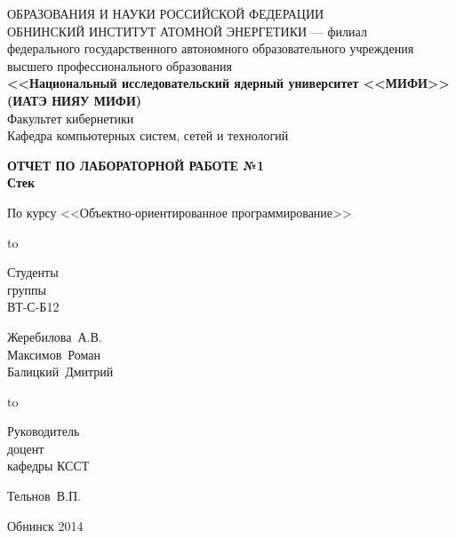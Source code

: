 
\begin{titlepage}
\newpage

\begin{center}
{\small{} ОБРАЗОВАНИЯ И НАУКИ РОССИЙСКОЙ ФЕДЕРАЦИИ\\
ОБНИНСКИЙ ИНСТИТУТ АТОМНОЙ ЭНЕРГЕТИКИ --- филиал}\\
федерального государственного автономного образовательного учреждения\\
высшего профессионального образования\\
{\bf<<Национальный исследовательский ядерный университет <<МИФИ>>\\
(ИАТЭ НИЯУ МИФИ)}\\
\vspace{2em}
Факультет кибернетики\\
Кафедра компьютерных систем, сетей и технологий
\end{center}
\vspace{2em}


\vspace{5em}
\begin{center}
\textbf{ОТЧЕТ ПО ЛАБОРАТОРНОЙ РАБОТЕ №1\\ Стек}
\end{center}


\begin{center}
По курсу <<Объектно-ориентированное программирование>>
\end{center}

\vspace{6em}

\hbox to \textwidth
{\parbox{6 cm}{Студенты\\ группы\\ ВТ-С-Б12}\dotfill \parbox{4 cm}{
\begin{flushright}Жеребилова~А.В.\\ Максимов~Роман\\ Балицкий~Дмитрий\end{flushright}}}
\vspace{2em}

\hbox to \textwidth
{\parbox{6 cm}{Руководитель\\доцент\\ кафедры КССТ}\dotfill \parbox{4 cm}{
\begin{flushright}Тельнов~В.П.\end{flushright}}}
\vspace{2em}



\vspace{\fill}

\begin{center}
Обнинск 2014
\end{center}

\end{titlepage}